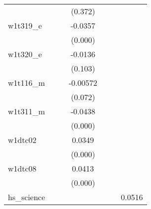 {\begin{tabular}{l*{6}{c}}
            &                     &                     &     (0.372)         &                     &                     &                     \\
[1em]
w1t319\_e    &                     &                     &     -0.0357\sym{***}&                     &                     &                     \\
            &                     &                     &     (0.000)         &                     &                     &                     \\
[1em]
w1t320\_e    &                     &                     &     -0.0136         &                     &                     &                     \\
            &                     &                     &     (0.103)         &                     &                     &                     \\
[1em]
w1t116\_m    &                     &                     &    -0.00572\sym{*}  &                     &                     &                     \\
            &                     &                     &     (0.072)         &                     &                     &                     \\
[1em]
w1t311\_m    &                     &                     &     -0.0438\sym{***}&                     &                     &                     \\
            &                     &                     &     (0.000)         &                     &                     &                     \\
[1em]
w1dtc02     &                     &                     &      0.0349\sym{***}&                     &                     &                     \\
            &                     &                     &     (0.000)         &                     &                     &                     \\
[1em]
w1dtc08     &                     &                     &      0.0413\sym{***}&                     &                     &                     \\
            &                     &                     &     (0.000)         &                     &                     &                     \\
[1em]
hs\_science  &                     &                     &                     &                     &                     &      0.0516\sym{***}\\

\end{tabular}}
